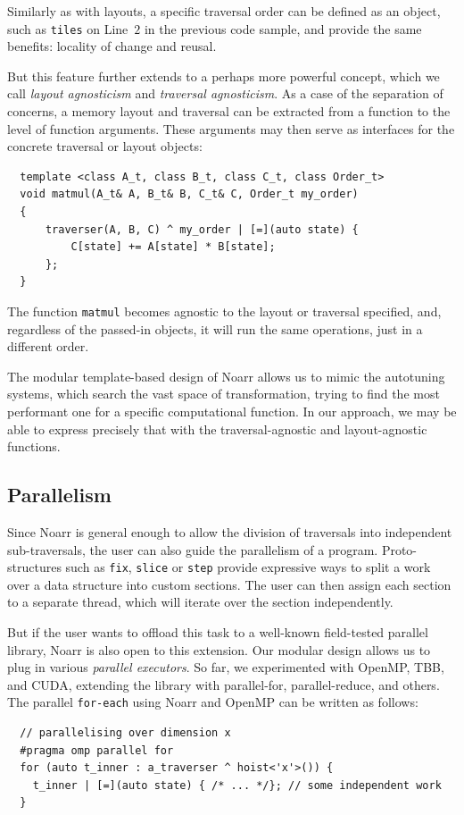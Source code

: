 Similarly as with layouts, a specific traversal order can be defined as an object, such as \texttt{tiles} on Line~$2$ in the previous code sample, and provide the same benefits: locality of change and reusal.

But this feature further extends to a perhaps more powerful concept, which we call \emph{layout agnosticism} and \emph{traversal agnosticism}. As a case of the separation of concerns, a memory layout and traversal can be extracted from a function to the level of function arguments. These arguments may then serve as interfaces for the concrete traversal or layout objects:

\begin{verbatim}
  template <class A_t, class B_t, class C_t, class Order_t>
  void matmul(A_t& A, B_t& B, C_t& C, Order_t my_order)
  {
      traverser(A, B, C) ^ my_order | [=](auto state) {
          C[state] += A[state] * B[state];
      };
  }
\end{verbatim}
The function \texttt{matmul} becomes agnostic to the layout or traversal specified, and, regardless of the passed-in objects, it will run the same operations, just in a different order.

The modular template-based design of Noarr allows us to mimic the autotuning systems, which search the vast space of transformation, trying to find the most performant one for a specific computational function. In our approach, we may be able to express precisely that with the traversal-agnostic and layout-agnostic functions.

\subsection{Parallelism}

Since Noarr is general enough to allow the division of traversals into independent sub-traversals, the user can also guide the parallelism of a program. Proto-structures such as \texttt{fix}, \texttt{slice} or \texttt{step} provide expressive ways to split a work over a data structure into custom sections. The user can then assign each section to a separate thread, which will iterate over the section independently.

But if the user wants to offload this task to a well-known field-tested parallel library, Noarr is also open to this extension. Our modular design allows us to plug in various \emph{parallel executors}. So far, we experimented with OpenMP, TBB, and CUDA, extending the library with parallel-for, parallel-reduce, and others. The parallel \texttt{for-each} using Noarr and OpenMP can be written as follows:
\begin{verbatim}
  // parallelising over dimension x
  #pragma omp parallel for 
  for (auto t_inner : a_traverser ^ hoist<'x'>()) { 
    t_inner | [=](auto state) { /* ... */}; // some independent work
  }
\end{verbatim}

